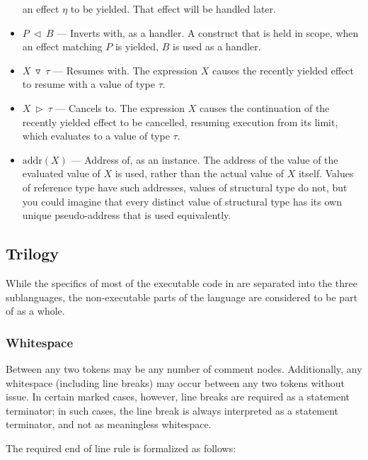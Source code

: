 \begin{itemize}
    an effect $\eta$ to be yielded. That effect will be handled later.
    \item $P\ \triangleleft\ B$ --- Inverts with, as a handler. A construct that is
    held in scope, when an effect matching $P$ is yielded, $B$ is used as a handler.
    \item $X\ \triangledown\ \tau$ --- Resumes with. The expression $X$ causes
    the recently yielded effect to resume with a value of type $\tau$.
    \item $X\ \triangleright\ \tau$ --- Cancels to. The expression $X$ causes the
    continuation of the recently yielded effect to be cancelled, resuming execution
    from its limit, which evaluates to a value of type $\tau$.
    \item $\text{addr}(X)$ --- Address of, as an instance. The address of the value
    of the evaluated value of $X$ is used, rather than the actual value of $X$
    itself. Values of reference type have such addresses, values of structural type
    do not, but you could imagine that every distinct value of structural type has
    its own unique pseudo-address that is used equivalently.
\end{itemize}

\subsection{Trilogy}

While the specifics of most of the executable code in \Trilogy{} are separated into
the three sublanguages, the non-executable parts of the language are considered
to be part of \Trilogy{} as a whole.

\subsubsection{Whitespace}

Between any two tokens may be any number of comment nodes. Additionally,
any whitespace (including line breaks) may occur between any two tokens
without issue. In certain marked cases, however, line breaks are required
as a statement terminator; in such cases, the line break is always interpreted
as a statement terminator, and not as meaningless whitespace.

The required end of line rule is formalized as follows:

\begin{bnf*}
     \\
\end{bnf*}

